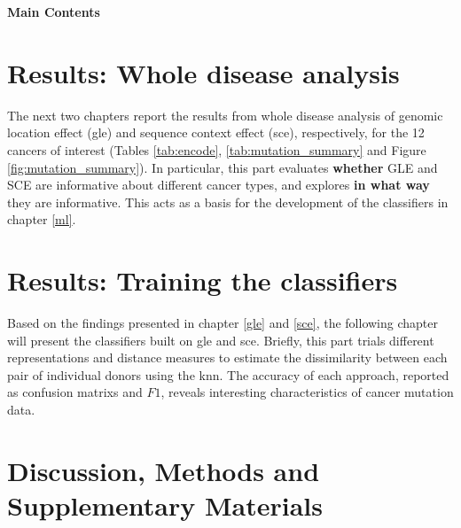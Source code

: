 \documentclass[12pt,a4paper, twoside,]{report}
\begin{document}





\newpage
\huge
\begin{center}
    \vspace*{9cm}
    \textbf{Main Contents}
\end{center}


\newpage

{
  \hypersetup{linkcolor=CadetBlue}
  \tableofcontents
}
\newpage
\label{glossary}
\printglossary
\newpage




\newpage

\part{Results: Whole disease analysis}{
    The next two chapters report the results from whole disease analysis of genomic location effect (\gls{gle}) and sequence context effect (\gls{sce}), respectively, for the 12 cancers of interest (Tables \ref{tab:encode}, \ref{tab:mutation_summary} and Figure \ref{fig:mutation_summary}). In particular, this part evaluates \textbf{whether} GLE and SCE are informative about different cancer types, and explores \textbf{in what way} they are informative. This acts as a basis for the development of the \glspl{classifier} in chapter \ref{ml}.
    }




\part{Results: Training the classifiers}{
    Based on the findings presented in chapter \ref{gle} and \ref{sce}, the following chapter will present the \glspl{classifier} built on \gls{gle} and \gls{sce}. Briefly, this part trials different representations and distance measures to estimate the dissimilarity between each pair of individual donors using the \gls{knn}. The accuracy of each approach, reported as \glspl{confusion matrix} and $F1$, reveals interesting characteristics of cancer mutation data.
    }




\part{Discussion, Methods and Supplementary Materials}{}









\end{document}
